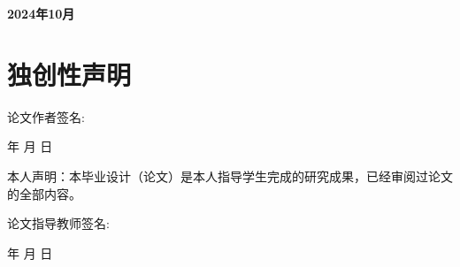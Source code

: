 {\begin{titlepage}
\begin{center}
    
    
    

    \vspace{50pt} %
    \textbf{\song\sihao 2024年10月}
    \end{center}
  \end{titlepage}

  \vspace{27.5pt}
  \chapter*{\textbf{\centering\erhao\songti 独创性声明}}
  \vspace{27.5pt}
  \sanhaoup %
  \@cdeclaration 
  \vspace{40pt} %

  \begin{center}
    论文作者签名:
  \end{center}

  \hfill  年 \hspace{1cm} 月 \hspace{1cm} 日

  \vspace{40pt} %
  本人声明：本毕业设计（论文）是本人指导学生完成的研究成果，已经审阅过论文的全部内容。

  \vspace{20pt} %
  \begin{center}
    论文指导教师签名:
  \end{center}

  \hfill  年 \hspace{1cm} 月 \hspace{1cm} 日

}
